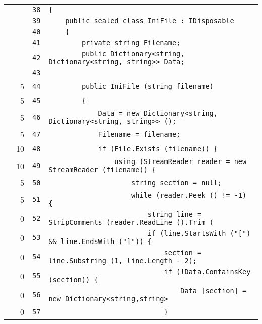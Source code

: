 \documentclass[a4paper,10pt]{article}
\begin{document}
\begin{longtable}[l]{lrrl}
\cellcolor{gray} &  & \verb~38~ & \verb~{~\\
\cellcolor{gray} &  & \verb~39~ & \verb~    public sealed class IniFile : IDisposable~\\
\cellcolor{gray} &  & \verb~40~ & \verb~    {~\\
\cellcolor{gray} &  & \verb~41~ & \verb~        private string Filename;~\\
\cellcolor{gray} &  & \verb~42~ & \verb~        public Dictionary<string, Dictionary<string, string>> Data;~\\
\cellcolor{gray} &  & \verb~43~ & \verb~~\\
\cellcolor{green} & 5 & \verb~44~ & \verb~        public IniFile (string filename)~\\
\cellcolor{green} & 5 & \verb~45~ & \verb~        {~\\
\cellcolor{green} & 5 & \verb~46~ & \verb~            Data = new Dictionary<string, Dictionary<string, string>> ();~\\
\cellcolor{green} & 5 & \verb~47~ & \verb~            Filename = filename;~\\
\cellcolor{green} & 10 & \verb~48~ & \verb~            if (File.Exists (filename)) {~\\
\cellcolor{green} & 10 & \verb~49~ & \verb~                using (StreamReader reader = new StreamReader (filename)) {~\\
\cellcolor{green} & 5 & \verb~50~ & \verb~                    string section = null;~\\
\cellcolor{green} & 5 & \verb~51~ & \verb~                    while (reader.Peek () != -1) {~\\
\cellcolor{red} & 0 & \verb~52~ & \verb~                        string line = StripComments (reader.ReadLine ().Trim (~\\
\cellcolor{red} & 0 & \verb~53~ & \verb~                        if (line.StartsWith ("[") && line.EndsWith ("]")) {~\\
\cellcolor{red} & 0 & \verb~54~ & \verb~                            section = line.Substring (1, line.Length - 2);~\\
\cellcolor{red} & 0 & \verb~55~ & \verb~                            if (!Data.ContainsKey (section)) {~\\
\cellcolor{red} & 0 & \verb~56~ & \verb~                                Data [section] = new Dictionary<string,string>~\\
\cellcolor{red} & 0 & \verb~57~ & \verb~                            }~\\

\end{longtable}
\end{document}
